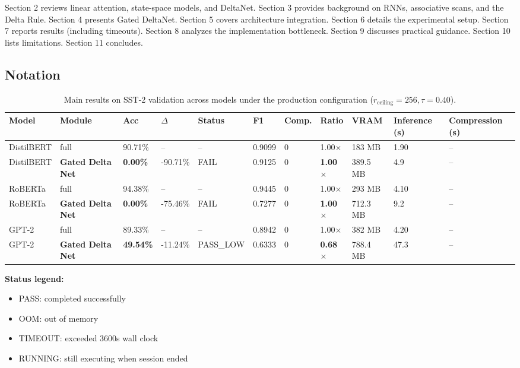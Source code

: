 Section 2 reviews linear attention, state-space models, and DeltaNet. 
Section 3 provides background on RNNs, associative scans, and the Delta 
Rule. Section 4 presents Gated DeltaNet. Section 5 covers architecture 
integration. Section 6 details the experimental setup. Section 7 reports 
results (including timeouts). Section 8 analyzes the implementation 
bottleneck. Section 9 discusses practical guidance. Section 10 lists 
limitations. Section 11 concludes.



\subsection{Notation}

\begin{table}[t]
\centering
\small
\begin{tabular}{lllllllllll}
\toprule
\textbf{Model} & \textbf{Module} & \textbf{Acc} & \textbf{$\Delta$} & \textbf{Status} & \textbf{F1} & \textbf{Comp.} & \textbf{Ratio} & \textbf{VRAM} & \textbf{Inference (s)} & \textbf{Compression (s)} \\
\midrule
DistilBERT & full & 90.71\% & -- & -- & 0.9099 & 0 & 1.00$\times$ & 183 MB & 1.90 & -- \\
DistilBERT & \textbf{Gated Delta Net} & \textbf{0.00\%} & -90.71\% & FAIL & 0.9125 & 0 & \textbf{1.00$\times$} & 389.5 MB & 4.9 & -- \\
RoBERTa & full & 94.38\% & -- & -- & 0.9445 & 0 & 1.00$\times$ & 293 MB & 4.10 & -- \\
RoBERTa & \textbf{Gated Delta Net} & \textbf{0.00\%} & -75.46\% & FAIL & 0.7277 & 0 & \textbf{1.00$\times$} & 712.3 MB & 9.2 & -- \\
GPT-2 & full & 89.33\% & -- & -- & 0.8942 & 0 & 1.00$\times$ & 382 MB & 4.20 & -- \\
GPT-2 & \textbf{Gated Delta Net} & \textbf{49.54\%} & -11.24\% & PASS_LOW & 0.6333 & 0 & \textbf{0.68$\times$} & 788.4 MB & 47.3 & -- \\
\bottomrule
\end{tabular}
\caption{Main results on SST-2 validation across models under the production configuration ($r_{\mathrm{ceiling}}=256, \tau=0.40$).}
\label{tab:main_sst2}
\end{table}

\textbf{Status legend:}
\begin{itemize}
\item PASS: completed successfully
\item OOM: out of memory
\item TIMEOUT: exceeded 3600s wall clock
\item RUNNING: still executing when session ended

\end{itemize}
